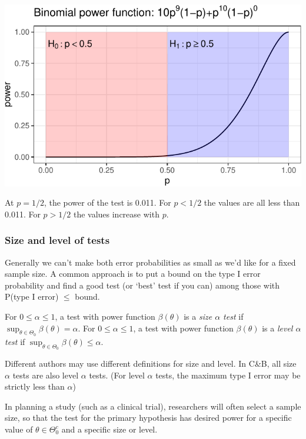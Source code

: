 \documentclass[11pt,]{article}
\begin{document}
\begin{center}\includegraphics[width=1\linewidth]{class_notes_files/figure-latex/unnamed-chunk-5-1} \end{center}

At \(p=1/2\), the power of the test is 0.011. For \(p< 1/2\) the values
are all less than 0.011. For \(p>1/2\) the values increase with \(p\).

\hypertarget{size-and-level-of-tests}{%
\subsubsection{Size and level of tests}\label{size-and-level-of-tests}}

Generally we can't make both error probabilities as small as we'd like
for a fixed sample size. A common approach is to put a bound on the type
I error probability and find a good test (or `best' test if you can)
among those with P(type I error) \(\leq\) bound.

 For \(0\leq \alpha \leq 1\), a test
with power function \(\beta(\theta)\) is a \emph{size \(\alpha\) test}
if \(\sup_{\theta \in \Theta_0} \beta(\theta) = \alpha\).
 For \(0\leq \alpha \leq 1\), a test
with power function \(\beta(\theta)\) is a \emph{level \(\alpha\) test}
if \(\sup_{\theta \in \Theta_0} \beta(\theta) \leq \alpha\).

Different authors may use different definitions for size and level. In
C\&B, all size \(\alpha\) tests are also level \(\alpha\) tests. (For
level \(\alpha\) tests, the maximum type I error may be strictly less
than \(\alpha\))

In planning a study (such as a clinical trial), researchers will often
select a sample size, so that the test for the primary hypothesis has
desired power for a specific value of \(\theta \in \Theta_0^c\) and a
specific size or level.
\end{document}
